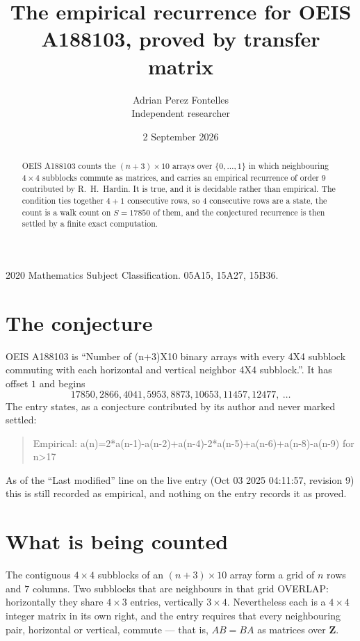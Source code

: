 \documentclass[11pt,a4paper]{article}
\title{The empirical recurrence for OEIS A188103, proved by transfer matrix}
\author{Adrian Perez Fontelles\\ \small Independent researcher}
\date{2 September 2026}
\theoremstyle{plain}
\theoremstyle{definition}
\begin{document}
\maketitle

\begin{abstract}
OEIS A188103 counts the $(n+3)\times10$ arrays over $\{0,\dots,1\}$ in which
neighbouring $4\times4$ subblocks commute as matrices, and carries an empirical
recurrence
of order $9$ contributed by R.~H.~Hardin. It is true, and it is decidable rather than
empirical. The condition ties together $4+1$ consecutive rows, so $4$ consecutive rows are
a state, the count is a walk count on $S=17850$ of them, and the conjectured recurrence is then
settled by a finite exact computation.
\end{abstract}

\noindent\small 2020 Mathematics Subject Classification. 05A15, 15A27, 15B36.\normalsize

\section{The conjecture}

OEIS A188103 is ``Number of (n+3)X10 binary arrays with every 4X4 subblock commuting with each horizontal and vertical neighbor 4X4 subblock.''. It has offset $1$ and begins
\[
17850, 2866, 4041, 5953, 8873, 10653, 11457, 12477,\ \dots
\]
The entry states, as a conjecture contributed by its author and never marked settled:
\begin{quote}
Empirical: a(n)=2*a(n-1)-a(n-2)+a(n-4)-2*a(n-5)+a(n-6)+a(n-8)-a(n-9) for n>17
\end{quote}
As of the ``Last modified'' line on the live entry (Oct 03 2025 04:11:57, revision 9) this is still
recorded as empirical, and nothing on the entry records it as proved.

\section{What is being counted}

The contiguous $4\times4$ subblocks of an $(n+3)\times10$ array form a grid of $n$
rows and $7$ columns. Two subblocks that are neighbours in that
grid OVERLAP: horizontally they share $4\times3$ entries, vertically
$3\times4$. Nevertheless each is a $4\times4$ integer matrix in its own right, and
the entry requires that every neighbouring pair, horizontal or vertical, commute --- that is,
$AB=BA$ as matrices over $\mathbf{Z}$.
\end{document}

